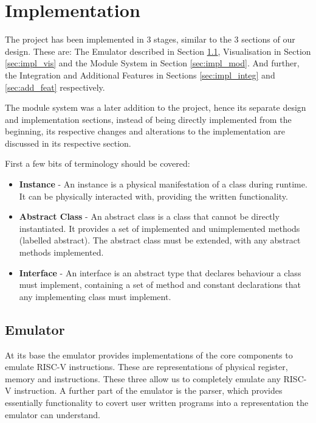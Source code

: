 \lstset{style=mystyle}


\chapter{Implementation}
\label{ch:implementation}
The project has been implemented in 3 stages, similar to the 3 sections of our design. These are: The Emulator described in Section \ref{sec:impl_emul}, Visualisation in Section \ref{sec:impl_vis} and the Module System in Section \ref{sec:impl_mod}. And further, the Integration and Additional Features in Sections \ref{sec:impl_integ} and \ref{sec:add_feat} respectively.
 
The module system was a later addition to the project, hence its separate design and implementation sections, instead of being directly implemented from the beginning, its respective changes and alterations to the implementation are discussed in its respective section.

First a few bits of terminology should be covered:

\begin{itemize}
    \item \textbf{Instance} - An instance is a physical manifestation of a class during runtime. It can be physically interacted with, providing the written functionality.
    \item \textbf{Abstract Class} - An abstract class is a class that cannot be directly instantiated. It provides a set of implemented and unimplemented methods (labelled abstract). The abstract class must be extended, with any abstract methods implemented.
    \item \textbf{Interface} - An interface is an abstract type that declares behaviour a class must implement, containing a set of method and constant declarations that any implementing class must implement.
\end{itemize}

\section{Emulator}\label{sec:impl_emul}
At its base the emulator provides implementations of the core components to emulate RISC-V instructions. These are representations of physical register, memory and instructions. These three allow us to completely emulate any RISC-V instruction. A further part of the emulator is the parser, which provides essentially functionality to covert user written programs into a representation the emulator can understand.

